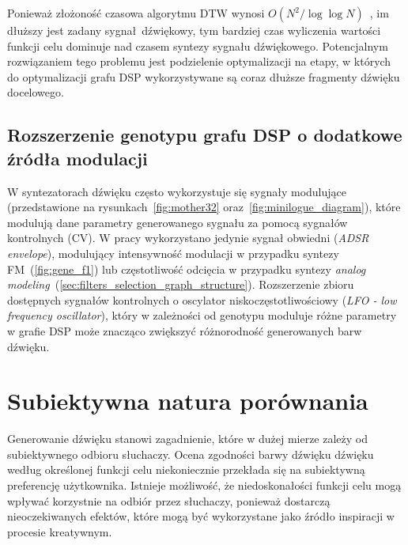 Ponieważ złożoność czasowa algorytmu DTW wynosi $O(N^2/\log\log N)$~\cite{dtw_time_complexity},
im dłuższy jest zadany sygnał dźwiękowy, tym bardziej czas wyliczenia
wartości funkcji celu dominuje nad czasem syntezy sygnału dźwiękowego. Potencjalnym
rozwiązaniem tego problemu jest podzielenie optymalizacji na etapy, w których
do optymalizacji grafu DSP wykorzystywane są coraz dłuższe fragmenty dźwięku docelowego.

\subsection{Rozszerzenie genotypu grafu DSP o dodatkowe źródła modulacji}

W syntezatorach dźwięku często wykorzystuje się sygnały modulujące (przedstawione
na rysunkach~\ref{fig:mother32} oraz~\ref{fig:minilogue_diagram}), które modulują
dane parametry generowanego sygnału za pomocą sygnałów kontrolnych (CV). 
W pracy wykorzystano jedynie sygnał obwiedni (\textit{ADSR envelope}),
modulujący intensywność modulacji w przypadku syntezy FM~(\ref{fig:gene_f1})
lub częstotliwość odcięcia w przypadku syntezy
\textit{analog modeling}~(\ref{sec:filters_selection_graph_structure}).
Rozszerzenie zbioru dostępnych sygnałów kontrolnych o oscylator niskoczęstotliwościowy
(\textit{LFO - low frequency oscillator}), który w zależności od genotypu
moduluje różne parametry w grafie DSP może znacząco zwiększyć różnorodność
generowanych barw dźwięku.


\section{Subiektywna natura porównania}

Generowanie dźwięku stanowi zagadnienie,
które w dużej mierze zależy od subiektywnego odbioru słuchaczy.
Ocena zgodności barwy dźwięku dźwięku według określonej funkcji celu
niekoniecznie przekłada się na subiektywną preferencję użytkownika.
Istnieje możliwość, że niedoskonałości funkcji celu mogą wpływać korzystnie na 
odbiór przez słuchaczy, ponieważ dostarczą nieoczekiwanych efektów, 
które mogą być wykorzystane jako źródło inspiracji w procesie kreatywnym.
